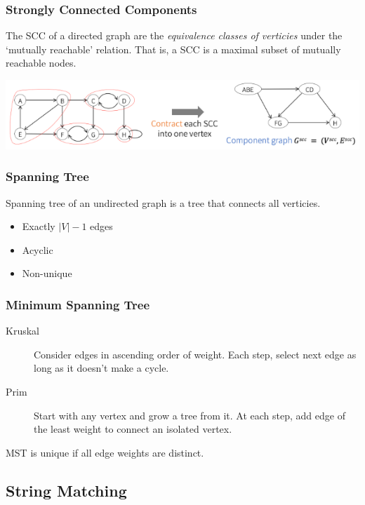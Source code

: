 \documentclass{article}
\begin{document}
\begin{multicols*}{2}
    \subsubsection*{Strongly Connected Components}
    The SCC of a directed graph are the \emph{equivalence classes of verticies}
    under the `mutually reachable' relation. That is, a SCC is a maximal subset
    of mutually reachable nodes.

    \includegraphics[width=\columnwidth]{scc.png}

    \subsubsection*{Spanning Tree}
    Spanning tree of an undirected graph is a tree that connects all verticies.
    \setlength{\columnsep}{-8em}
    \begin{multicols*}{2}
        \begin{itemize}
            \item Exactly \(|V| - 1\) edges
            \item Acyclic
            \item Non-unique
        \end{itemize}
        \subsubsection*{Minimum Spanning Tree}
        \begin{description}
            \item[Kruskal] Consider edges in ascending order of weight. Each
                step, select next edge as long as it doesn't make a cycle.
            \item[Prim] Start with any vertex and grow a tree from it. At each
                step, add edge of the least weight to connect an isolated vertex.
        \end{description}
    \end{multicols*}
    MST is unique if all edge weights are distinct.

    \subsection*{String Matching}

\end{multicols*}
\end{document}
